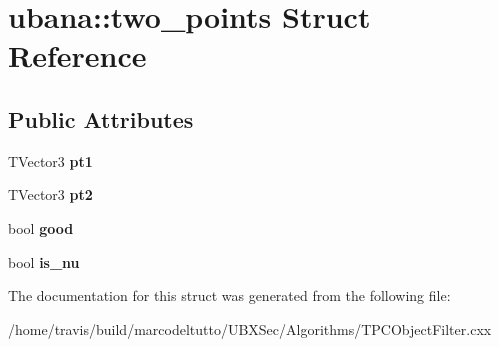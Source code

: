 \hypertarget{structubana_1_1two__points}{\section{ubana\-:\-:two\-\_\-points \-Struct \-Reference}
\label{structubana_1_1two__points}
}
\subsection*{\-Public \-Attributes}
\begin{DoxyCompactItemize}
\item 
\hypertarget{structubana_1_1two__points_a7b4a3fb2486d98f65c2d1cc0e25ca20a}{\-T\-Vector3 {\bfseries pt1}}\label{structubana_1_1two__points_a7b4a3fb2486d98f65c2d1cc0e25ca20a}

\item 
\hypertarget{structubana_1_1two__points_ac013f258d66c091f55489a60ada46644}{\-T\-Vector3 {\bfseries pt2}}\label{structubana_1_1two__points_ac013f258d66c091f55489a60ada46644}

\item 
\hypertarget{structubana_1_1two__points_a50a483a90b03dc2e75ae4b187497047f}{bool {\bfseries good}}\label{structubana_1_1two__points_a50a483a90b03dc2e75ae4b187497047f}

\item 
\hypertarget{structubana_1_1two__points_a362517d5a9d32842eed0533e9a6c14bc}{bool {\bfseries is\-\_\-nu}}\label{structubana_1_1two__points_a362517d5a9d32842eed0533e9a6c14bc}

\end{DoxyCompactItemize}


\-The documentation for this struct was generated from the following file\-:\begin{DoxyCompactItemize}
\item 
/home/travis/build/marcodeltutto/\-U\-B\-X\-Sec/\-Algorithms/\-T\-P\-C\-Object\-Filter.\-cxx\end{DoxyCompactItemize}
